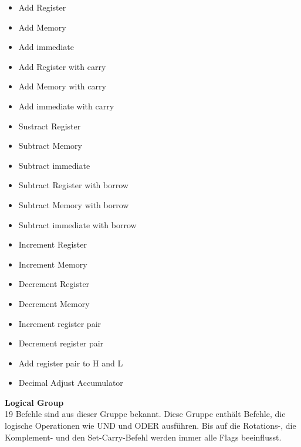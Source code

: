\documentclass[12pt]{article}
\begin{document}
\begin{multicols}{2}
\begin{itemize}
\item Add Register
\item Add Memory
\item Add immediate
\item Add Register with carry
\item Add Memory with carry
\item Add immediate with carry
\item Sustract Register
\item Subtract Memory
\item Subtract immediate
\item Subtract Register with borrow
\item Subtract Memory with borrow
\item Subtract immediate with borrow
\item Increment Register
\item Increment Memory
\item Decrement Register
\item Decrement Memory
\item Increment register pair
\item Decrement register pair
\item Add register pair to H and L
\item Decimal Adjust Accumulator
\end{itemize}
\end{multicols}

\vspace{10pt}
\noindent
\textbf{Logical Group}\\
19 Befehle sind aus dieser Gruppe bekannt. Diese Gruppe enthält Befehle, die logische Operationen wie UND und ODER ausführen. Bis auf die Rotations-, die Komplement- und den Set-Carry-Befehl werden immer alle Flags beeinflusst.
\end{document}
